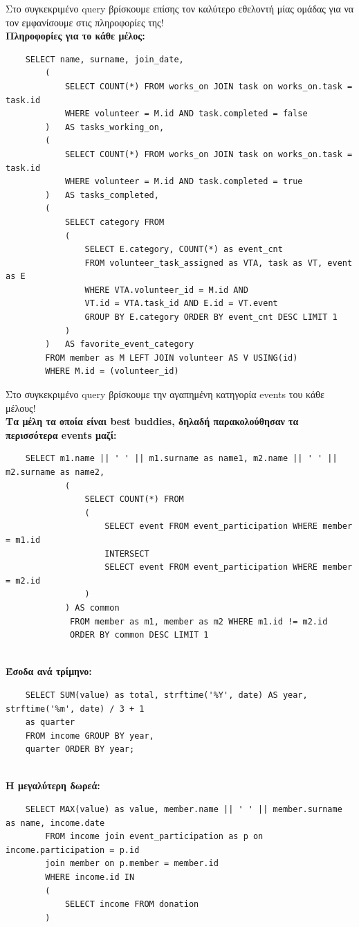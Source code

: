 \documentclass[manuscript,screen,review]{acmart}
\newcommand{\en}[1]{\foreignlanguage{english}{#1}}
\begin{document}
        Στο συγκεκριμένο \en{query} βρίσκουμε επίσης τον καλύτερο εθελοντή μίας ομάδας για να τον εμφανίσουμε στις πληροφορίες της!\\
\textbf{Πληροφορίες για το κάθε μέλος:}
    \begin{lstlisting}
    SELECT name, surname, join_date, 
        (
            SELECT COUNT(*) FROM works_on JOIN task on works_on.task = task.id
            WHERE volunteer = M.id AND task.completed = false
        )   AS tasks_working_on, 
        (
            SELECT COUNT(*) FROM works_on JOIN task on works_on.task = task.id
            WHERE volunteer = M.id AND task.completed = true
        )   AS tasks_completed,
        (
            SELECT category FROM 
            (
                SELECT E.category, COUNT(*) as event_cnt
                FROM volunteer_task_assigned as VTA, task as VT, event as E 
                WHERE VTA.volunteer_id = M.id AND
                VT.id = VTA.task_id AND E.id = VT.event 
                GROUP BY E.category ORDER BY event_cnt DESC LIMIT 1
            )
        )   AS favorite_event_category
        FROM member as M LEFT JOIN volunteer AS V USING(id)
        WHERE M.id = (volunteer_id)
    \end{lstlisting}
    
    Στο συγκεκριμένο \en{query} βρίσκουμε την αγαπημένη κατηγορία \en{events} του κάθε μέλους!\\
\textbf{Τα μέλη τα οποία είναι \en{best buddies}, δηλαδή παρακολούθησαν τα περισσότερα \en{events} μαζί:}
    \begin{lstlisting}
    SELECT m1.name || ' ' || m1.surname as name1, m2.name || ' ' || m2.surname as name2, 
            (
                SELECT COUNT(*) FROM 
                (
                    SELECT event FROM event_participation WHERE member = m1.id
                    INTERSECT
                    SELECT event FROM event_participation WHERE member = m2.id
                )
            ) AS common
             FROM member as m1, member as m2 WHERE m1.id != m2.id
             ORDER BY common DESC LIMIT 1
    \end{lstlisting}
    \\
\textbf{Έσοδα ανά τρίμηνο:}
    \begin{lstlisting}
    SELECT SUM(value) as total, strftime('%Y', date) AS year, strftime('%m', date) / 3 + 1
    as quarter
    FROM income GROUP BY year, 
    quarter ORDER BY year;
    \end{lstlisting}
    \\
\textbf{Η μεγαλύτερη δωρεά:}
    \begin{lstlisting}
    SELECT MAX(value) as value, member.name || ' ' || member.surname as name, income.date 
        FROM income join event_participation as p on income.participation = p.id
        join member on p.member = member.id
        WHERE income.id IN 
        (
            SELECT income FROM donation
        )
    \end{lstlisting}
\end{document}
